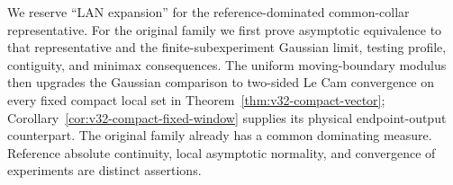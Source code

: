 \begin{remark}[Terminology]
We reserve ``LAN expansion'' for the reference-dominated common-collar representative.
For the original family we first prove asymptotic equivalence to that
representative and the finite-subexperiment Gaussian limit, testing profile,
contiguity, and minimax consequences.  The uniform moving-boundary modulus
then upgrades the Gaussian comparison to two-sided Le Cam convergence on
every fixed compact local set in Theorem~\ref{thm:v32-compact-vector};
Corollary~\ref{cor:v32-compact-fixed-window} supplies its physical
endpoint-output counterpart.  The original family already has a common
dominating measure.
Reference absolute continuity, local asymptotic normality, and convergence
of experiments are distinct assertions.
\end{remark}